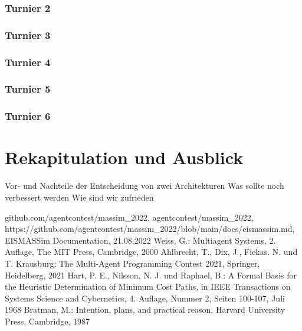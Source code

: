 \documentclass[runningheads]{llncs}
\begin{document}
\subsubsection{Turnier 2}
\subsubsection{Turnier 3}
\subsubsection{Turnier 4}
\subsubsection{Turnier 5}
\subsubsection{Turnier 6}

\section{Rekapitulation und Ausblick}
Vor- und Nachteile der Entscheidung von zwei Architekturen
Was sollte noch verbessert werden
Wie sind wir zufrieden


%
%
%
% 
% 
%
\begin{thebibliography}{8}
	github.com/agentcontest/massim\_2022, agentcontest/massim\_2022, \\ https://github.com/agentcontest/massim\_2022/blob/main/docs/eismassim.md, EISMASSim Documentation, 21.08.2022
	Weiss, G.: Multiagent Systems, 2. Auflage, The MIT Press, Cambridge, 2000
	Ahlbrecht, T., Dix, J., Fiekas. N. und T. Krausburg: The Multi-Agent Programming Contest 2021, Springer, Heidelberg, 2021
	Hart, P. E., Nilsson, N. J. und Raphael, B.: A Formal Basis for the Heuristic Determination of Minimum Cost Paths, in IEEE Transactions on Systems Science and Cybernetics, 4. Auflage, Nummer 2, Seiten 100-107, Juli 1968
	Bratman, M.: Intention, plans, and practical reason, Harvard University Press, Cambridge, 1987
\end{thebibliography}
\end{document}
